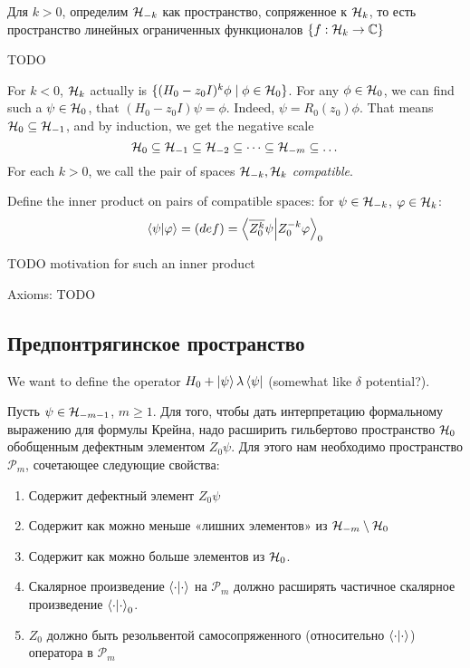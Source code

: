 Для $k > 0$, определим $\mathcal{H}_{-k}$ как пространство, сопряженное к $\mathcal{H}_{k}$, то есть пространство линейных ограниченных функционалов $\{ f: \mathcal{H}_{k} \to \mathbb{C} \}$

TODO

For $k < 0$, $\mathcal{H}_{k}$ actually is $\{ (H_0 - z_0 I)^k \phi \mid \phi \in \mathcal{H}_{0} \}$.
For any $\phi \in \mathcal{H}_{0}$, we can find such a $\psi \in \mathcal{H}_{0}$, that $(H_0 - z_0 I) \psi = \phi$. Indeed, $\psi = R_0(z_0) \phi$. That means $\mathcal{H}_{0} \subseteq \mathcal{H}_{-1}$, and by induction, we get the negative scale
\[
\mathcal{H}_{0} \subseteq \mathcal{H}_{-1} \subseteq \mathcal{H}_{-2} \subseteq \dots \subseteq \mathcal{H}_{-m} \subseteq \dots
\] 
For each $k > 0$, we call the pair of spaces $\mathcal{H}_{-k}, \mathcal{H}_{k}$ \textit{compatible}.

Define the inner product on pairs of compatible spaces: for $\psi \in \mathcal{H}_{-k}$, $\varphi \in \mathcal{H}_{k}$:
\[
\ip{\psi}{\varphi} = (def) = \ip{\cconj{Z_0^k} \psi}{Z_0^{-k} \varphi}_0
\]

TODO motivation for such an inner product

Axioms: TODO




\subsection{Предпонтрягинское пространство}
We want to define the operator $H_0 + \ket{\psi} \lambda \bra{\psi}$ (somewhat like $\delta$ potential?).

Пусть $\psi \in \mathcal{H}_{-m - 1}$, $m \ge 1$. Для того, чтобы дать интерпретацию формальному выражению для формулы Крейна, надо расширить гильбертово пространство $\mathcal{H}_{0}$ обобщенным дефектным элементом $Z_0 \psi$. Для этого нам необходимо пространство $\mathcal{P}_m$, сочетающее следующие свойства:

\begin{enumerate}
\item Содержит дефектный элемент $Z_0 \psi$
\item Содержит как можно меньше «лишних элементов» из  $\mathcal{H}_{-m} \setminus \mathcal{H}_{0}$
\item Содержит как можно больше элементов из $\mathcal{H}_{0}$.
\item Скалярное произведение $\ip{\cdot}{\cdot}$ на $\mathcal{P}_m$ должно расширять частичное скалярное произведение $\ip{\cdot}{\cdot}_0$.
\item $Z_0$ должно быть резольвентой самосопряженного (относительно $\ip{\cdot}{\cdot}$) оператора в $\mathcal{P}_m$
\end{enumerate}

